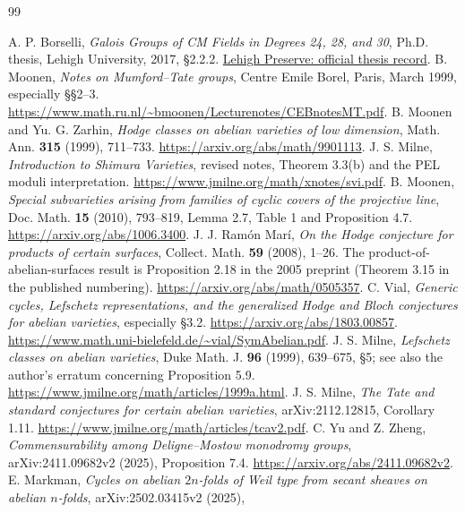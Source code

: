 \documentclass[11pt,reqno]{article}
\theoremstyle{emphasizedplain}
\theoremstyle{emphasizeddefinition}
\theoremstyle{emphasizeddefinition}
\begin{document}
\clearpage
\begin{thebibliography}{99}
A. P. Borselli, \emph{Galois Groups of CM Fields in Degrees 24, 28,
and 30}, Ph.D. thesis, Lehigh University, 2017, \S2.2.2.
\href{https://preserve.lehigh.edu/lehigh-scholarship/graduate-publications-theses-dissertations/theses-dissertations/galois-groups-cm}{Lehigh Preserve: official thesis record}.
B. Moonen, \emph{Notes on Mumford--Tate groups}, Centre Emile Borel,
Paris, March 1999, especially \S\S2--3.
\url{https://www.math.ru.nl/~bmoonen/Lecturenotes/CEBnotesMT.pdf}.
B. Moonen and Yu. G. Zarhin, \emph{Hodge classes on abelian varieties of
low dimension}, Math. Ann. \textbf{315} (1999), 711--733.
\url{https://arxiv.org/abs/math/9901113}.
J. S. Milne, \emph{Introduction to Shimura Varieties}, revised notes,
Theorem 3.3(b) and the PEL moduli interpretation.
\url{https://www.jmilne.org/math/xnotes/svi.pdf}.
B. Moonen, \emph{Special subvarieties arising from families of cyclic
covers of the projective line}, Doc. Math. \textbf{15} (2010), 793--819,
Lemma 2.7, Table 1 and Proposition 4.7.
\url{https://arxiv.org/abs/1006.3400}.
J. J. Ram\'on Mar\'i, \emph{On the Hodge conjecture for products of
certain surfaces}, Collect. Math. \textbf{59} (2008), 1--26.
The product-of-abelian-surfaces result is Proposition 2.18 in the
2005 preprint (Theorem 3.15 in the published numbering).
\url{https://arxiv.org/abs/math/0505357}.
C. Vial, \emph{Generic cycles, Lefschetz representations, and the generalized
Hodge and Bloch conjectures for abelian varieties}, especially \S3.2.
\url{https://arxiv.org/abs/1803.00857}.
\url{https://www.math.uni-bielefeld.de/~vial/SymAbelian.pdf}.
J. S. Milne, \emph{Lefschetz classes on abelian varieties},
Duke Math. J. \textbf{96} (1999), 639--675, \S5;
see also the author's erratum concerning Proposition 5.9.
\url{https://www.jmilne.org/math/articles/1999a.html}.
J. S. Milne, \emph{The Tate and standard conjectures for certain
abelian varieties}, arXiv:2112.12815, Corollary 1.11.
\url{https://www.jmilne.org/math/articles/tcav2.pdf}.
C. Yu and Z. Zheng, \emph{Commensurability among Deligne--Mostow
monodromy groups}, arXiv:2411.09682v2 (2025), Proposition 7.4.
\url{https://arxiv.org/abs/2411.09682v2}.
E. Markman, \emph{Cycles on abelian $2n$-folds of Weil type from secant
sheaves on abelian $n$-folds}, arXiv:2502.03415v2 (2025),

\end{thebibliography}
\end{document}

